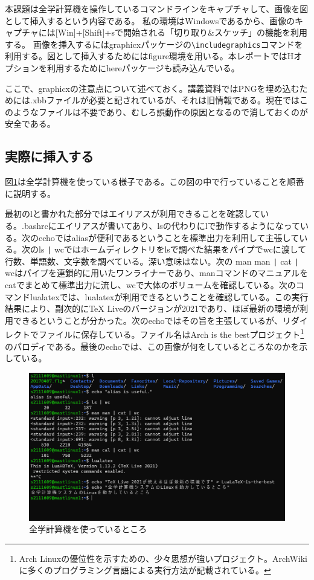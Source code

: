 \documentclass[dvipdfmx,12pt,a4j]{jarticle}
\begin{document}
本課題は全学計算機を操作しているコマンドラインをキャプチャして、画像を図として挿入するという内容である。
私の環境はWindowsであるから、画像のキャプチャには[Win]+[Shift]+sで開始される「切り取り\&スケッチ」の機能を利用する。
画像を挿入するにはgraphicxパッケージの\verb|\includegraphics|コマンドを利用する。図として挿入するためにはfigure環境を用いる。本レポートではHオプションを利用するためにhereパッケージも読み込んでいる。

ここで、graphicxの注意点について述べておく。講義資料ではPNGを埋め込むためには.xbbファイルが必要と記されているが、それは旧情報である。現在ではこのようなファイルは不要であり、むしろ誤動作の原因となるので消しておくのが安全である。\cite[p.126]{bibunsho}

\subsection{実際に挿入する}\label{subsection:実際に挿入する}
図\ref{fig:keisanki}は全学計算機を使っている様子である。この図の中で行っていることを順番に説明する。

最初のlと書かれた部分ではエイリアスが利用できることを確認している。.bashrcにエイリアスが書いてあり、lsの代わりにlで動作するようになっている。次のechoではaliasが便利であるということを標準出力を利用して主張している。次のls \verb+|+ wcではホームディレクトリをlsで調べた結果をパイプでwcに渡して行数、単語数、文字数を調べている。深い意味はない。次の man man \verb+|+ cat \verb+|+ wcはパイプを連鎖的に用いたワンライナーであり、manコマンドのマニュアルをcatでまとめて標準出力に流し、wcで大体のボリュームを確認している。次のコマンドlualatexでは、lualatexが利用できるということを確認している。この実行結果により、副次的にTeX Liveのバージョンが2021であり、ほぼ最新の環境が利用できるということが分かった。次のechoではその旨を主張しているが、リダイレクトでファイルに保存している。ファイル名はArch is the bestプロジェクト\footnote{Arch Linuxの優位性を示すための、少々思想が強いプロジェクト。ArchWikiに多くのプログラミング言語による実行方法が記載されている。}のパロディである。最後のechoでは、この画像が何をしているところなのかを示している。
\begin{figure}[H]
  \centering
  \includegraphics[width=15cm]{imgs/commandline.png}
  \caption{全学計算機を使っているところ}
  \label{fig:keisanki}
\end{figure}
\end{document}

